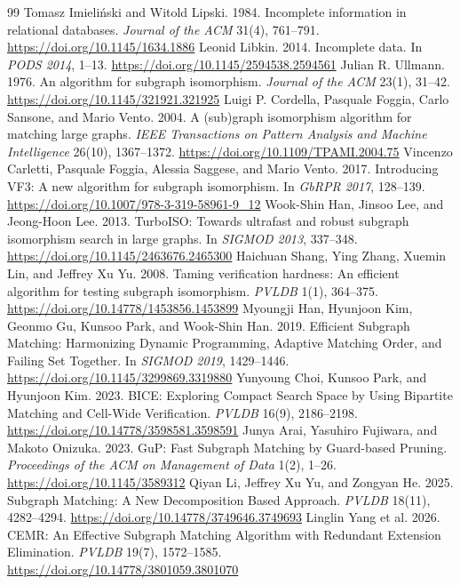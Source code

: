 \begin{thebibliography}{99}
 Tomasz Imieli\'nski and Witold Lipski. 1984. Incomplete information in relational databases. \textit{Journal of the ACM} 31(4), 761--791. \url{https://doi.org/10.1145/1634.1886}
 Leonid Libkin. 2014. Incomplete data. In \textit{PODS 2014}, 1--13. \url{https://doi.org/10.1145/2594538.2594561}
 Julian R. Ullmann. 1976. An algorithm for subgraph isomorphism. \textit{Journal of the ACM} 23(1), 31--42. \url{https://doi.org/10.1145/321921.321925}
 Luigi P. Cordella, Pasquale Foggia, Carlo Sansone, and Mario Vento. 2004. A (sub)graph isomorphism algorithm for matching large graphs. \textit{IEEE Transactions on Pattern Analysis and Machine Intelligence} 26(10), 1367--1372. \url{https://doi.org/10.1109/TPAMI.2004.75}
 Vincenzo Carletti, Pasquale Foggia, Alessia Saggese, and Mario Vento. 2017. Introducing VF3: A new algorithm for subgraph isomorphism. In \textit{GbRPR 2017}, 128--139. \url{https://doi.org/10.1007/978-3-319-58961-9_12}
 Wook-Shin Han, Jinsoo Lee, and Jeong-Hoon Lee. 2013. TurboISO: Towards ultrafast and robust subgraph isomorphism search in large graphs. In \textit{SIGMOD 2013}, 337--348. \url{https://doi.org/10.1145/2463676.2465300}
 Haichuan Shang, Ying Zhang, Xuemin Lin, and Jeffrey Xu Yu. 2008. Taming verification hardness: An efficient algorithm for testing subgraph isomorphism. \textit{PVLDB} 1(1), 364--375. \url{https://doi.org/10.14778/1453856.1453899}
 Myoungji Han, Hyunjoon Kim, Geonmo Gu, Kunsoo Park, and Wook-Shin Han. 2019. Efficient Subgraph Matching: Harmonizing Dynamic Programming, Adaptive Matching Order, and Failing Set Together. In \textit{SIGMOD 2019}, 1429--1446. \url{https://doi.org/10.1145/3299869.3319880}
 Yunyoung Choi, Kunsoo Park, and Hyunjoon Kim. 2023. BICE: Exploring Compact Search Space by Using Bipartite Matching and Cell-Wide Verification. \textit{PVLDB} 16(9), 2186--2198. \url{https://doi.org/10.14778/3598581.3598591}
 Junya Arai, Yasuhiro Fujiwara, and Makoto Onizuka. 2023. GuP: Fast Subgraph Matching by Guard-based Pruning. \textit{Proceedings of the ACM on Management of Data} 1(2), 1--26. \url{https://doi.org/10.1145/3589312}
 Qiyan Li, Jeffrey Xu Yu, and Zongyan He. 2025. Subgraph Matching: A New Decomposition Based Approach. \textit{PVLDB} 18(11), 4282--4294. \url{https://doi.org/10.14778/3749646.3749693}
 Linglin Yang et al. 2026. CEMR: An Effective Subgraph Matching Algorithm with Redundant Extension Elimination. \textit{PVLDB} 19(7), 1572--1585. \url{https://doi.org/10.14778/3801059.3801070}

\end{thebibliography}
